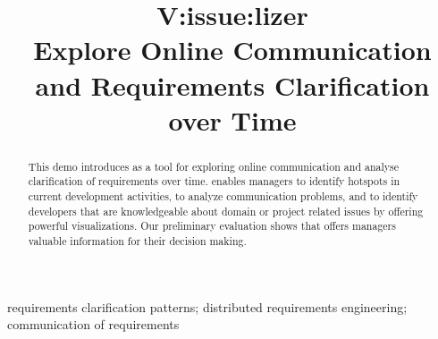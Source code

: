 
\title{V:issue:lizer\\Explore Online Communication and  Requirements Clarification over Time}


\author{
}

\maketitle


\begin{abstract}
This demo introduces \viss as a tool for exploring online communication and analyse clarification of requirements over time.
\viss enables managers to identify hotspots in current development activities, to analyze communication problems, and to identify developers that are knowledgeable about domain or project related issues by offering powerful visualizations.
Our preliminary evaluation shows that \viss offers managers valuable information for their decision making.
\end{abstract}

\begin{IEEEkeywords}
requirements clarification patterns; distributed requirements engineering; communication of requirements
\end{IEEEkeywords}
